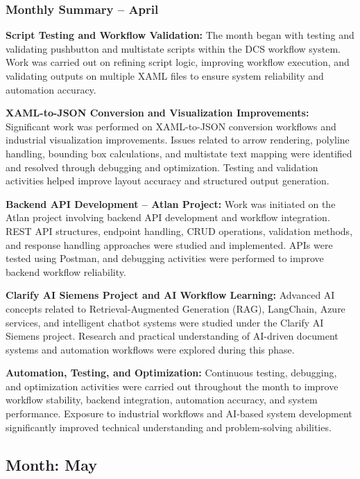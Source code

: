 \documentclass[12pt,a4paper]{report}
\begin{document}
\subsubsection*{Monthly Summary -- April}
\textbf{Script Testing and Workflow Validation:}
The month began with testing and validating pushbutton and multistate scripts within the DCS workflow system. Work was carried out on refining script logic, improving workflow execution, and validating outputs on multiple XAML files to ensure system reliability and automation accuracy.

\textbf{XAML-to-JSON Conversion and Visualization Improvements:}
Significant work was performed on XAML-to-JSON conversion workflows and industrial visualization improvements. Issues related to arrow rendering, polyline handling, bounding box calculations, and multistate text mapping were identified and resolved through debugging and optimization. Testing and validation activities helped improve layout accuracy and structured output generation.

\textbf{Backend API Development -- Atlan Project:}
Work was initiated on the Atlan project involving backend API development and workflow integration. REST API structures, endpoint handling, CRUD operations, validation methods, and response handling approaches were studied and implemented. APIs were tested using Postman, and debugging activities were performed to improve backend workflow reliability.

\textbf{Clarify AI Siemens Project and AI Workflow Learning:}
Advanced AI concepts related to Retrieval-Augmented Generation (RAG), LangChain, Azure services, and intelligent chatbot systems were studied under the Clarify AI Siemens project. Research and practical understanding of AI-driven document systems and automation workflows were explored during this phase.

\textbf{Automation, Testing, and Optimization:}
Continuous testing, debugging, and optimization activities were carried out throughout the month to improve workflow stability, backend integration, automation accuracy, and system performance. Exposure to industrial workflows and AI-based system development significantly improved technical understanding and problem-solving abilities.
\newpage
\subsection*{Month: May}
\end{document}
